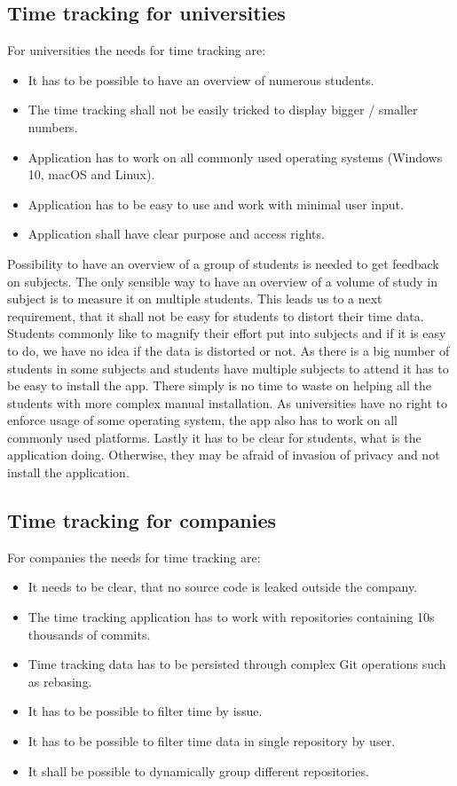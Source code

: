 \subsection{Time tracking for universities}\label{subsec:time-tracking-for-universities}
For universities the needs for time tracking are:
\begin{itemize}
    \item It has to be possible to have an overview of numerous students.
    \item The time tracking shall not be easily tricked to display bigger / smaller numbers.
    \item Application has to work on all commonly used operating systems (Windows 10, macOS and Linux).
    \item Application has to be easy to use and work with minimal user input.
    \item Application shall have clear purpose and access rights.
\end{itemize}

Possibility to have an overview of a group of students is needed to get feedback on subjects.
The only sensible way to have an overview of a volume of study in subject is to measure it on multiple students.
This leads us to a next requirement, that it shall not be easy for students to distort their time data.
Students commonly like to magnify their effort put into subjects and if it is easy to do, we have no idea if the data is distorted or not.
As there is a big number of students in some subjects and students have multiple subjects to attend it has to be easy to install the app.
There simply is no time to waste on helping all the students with more complex manual installation.
As universities have no right to enforce usage of some operating system, the app also has to work on all commonly used platforms.
Lastly it has to be clear for students, what is the application doing.
Otherwise, they may be afraid of invasion of privacy and not install the application.

\subsection{Time tracking for companies}\label{subsec:time-tracking-for-companies}
For companies the needs for time tracking are:
\begin{itemize}
    \item It needs to be clear, that no source code is leaked outside the company.
    \item The time tracking application has to work with repositories containing 10s thousands of commits.
    \item Time tracking data has to be persisted through complex Git operations such as rebasing.
    \item It has to be possible to filter time by issue.
    \item It has to be possible to filter time data in single repository by user.
    \item It shall be possible to dynamically group different repositories.
\end{itemize}

